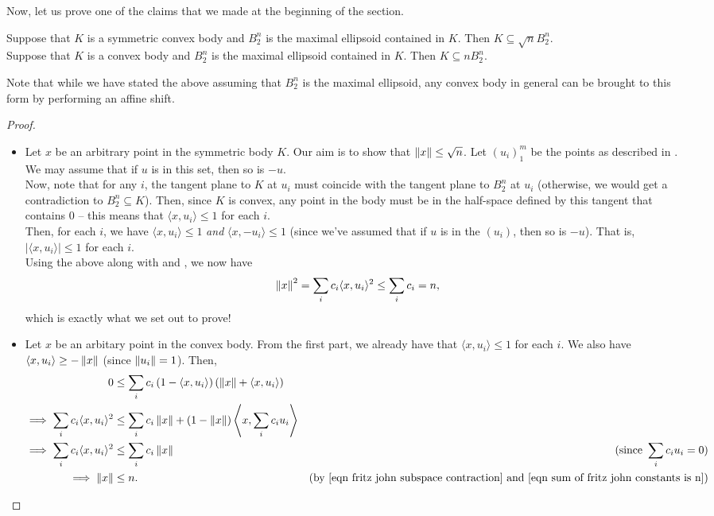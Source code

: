 Now, let us prove one of the claims that we made at the beginning of the section.

\begin{ftheo}
\label{fritz john banach mazur distance}
Suppose that $K$ is a symmetric convex body and $B_2^n$ is the maximal ellipsoid contained in $K$. Then $K\subseteq\sqrt{n} B_2^n$.\\
Suppose that $K$ is a convex body and $B_2^n$ is the maximal ellipsoid contained in $K$. Then $K\subseteq n B_2^n$.
\end{ftheo}
Note that while we have stated the above assuming that $B_2^n$ is the maximal ellipsoid, any convex body in general can be brought to this form by performing an affine shift.
\begin{proof}
\phantom{OWO}
\begin{itemize}
    \item Let $x$ be an arbitrary point in the symmetric body $K$. Our aim is to show that $\left\lVert x\right\rVert\leq\sqrt{n}$. Let $(u_i)_1^m$ be the points as described in . We may assume that if $u$ is in this set, then so is $-u$.\\
    Now, note that for any $i$, the tangent plane to $K$ at $u_i$ must coincide with the tangent plane to $B_2^n$ at $u_i$ (otherwise, we would get a contradiction to $B_2^n\subseteq K$). Then, since $K$ is convex, any point in the body must be in the half-space defined by this tangent that contains $0$ -- this means that $\langle x,u_i\rangle \leq 1$ for each $i$.\\
    Then, for each $i$, we have $\langle x,u_i\rangle \leq 1$ \textit{and} $\langle x,-u_i\rangle\leq 1$ (since we've assumed that if $u$ is in the $(u_i)$, then so is $-u$). That is, $|\langle x,u_i\rangle|\leq 1$ for each $i$.\\
    Using the above along with  and , we now have
    \[ \left\lVert x\right\rVert^2 = \sum_i c_i\langle x,u_i\rangle^2 \leq \sum_i c_i = n, \]
    which is exactly what we set out to prove!
    
    \item Let $x$ be an arbitary point in the convex body. From the first part, we already have that $\langle x,u_i\rangle \leq 1$ for each $i$. We also have $\langle x,u_i\rangle \geq -\left\lVert x\right\rVert$ (since $\left\lVert u_i\right\rVert=1$). Then,
    \begin{align*}
        0 &\leq \sum_i c_i\left(1 - \langle x,u_i\rangle\right)\left( \norm{x} + \langle x,u_i\rangle\right) \\
        \implies \sum_i c_i\langle x,u_i\rangle^2 &\leq \sum_i c_i \norm{x} + (1-\norm{x})\left\langle x,\sum_i c_i u_i \right\rangle \\
        \implies \sum_i c_i\langle x,u_i\rangle^2 &\leq \sum_i c_i \norm{x} & (\text{since }\sum_i c_i u_i = 0) \\
        \implies \norm{x} &\leq n. & (\text{by \Cref{eqn fritz john subspace contraction} and \Cref{eqn sum of fritz john constants is n}})
    \end{align*}
\end{itemize}
\end{proof}

